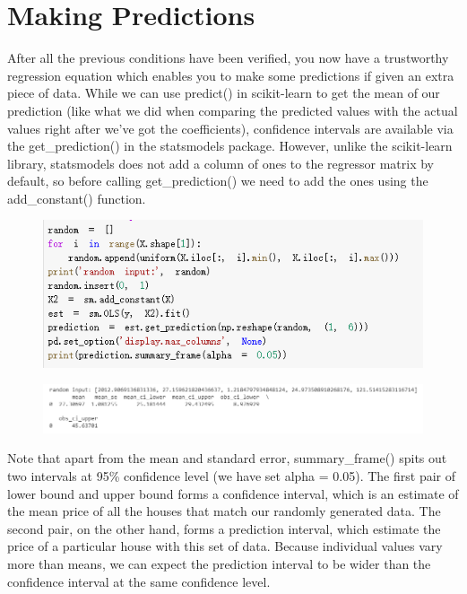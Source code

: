 \documentclass{article}
\begin{document}
\section*{Making Predictions}
After all the previous conditions have been verified, you now have a trustworthy regression equation which enables you to make some predictions if given an extra piece of data. While we can use predict() in scikit-learn to get the mean of our prediction (like what we did when comparing the predicted values with the actual values right after we've got the coefficients), confidence intervals are available via the get\_prediction() in the statsmodels package. However, unlike the scikit-learn library, statsmodels does not add a column of ones to the regressor matrix by default, so before calling get\_prediction() we need to add the ones using the add\_constant() function.
\begin{figure}[H]\centering\includegraphics[width=\linewidth]{23}\end{figure}
\begin{figure}[H]\centering\includegraphics[width=1.05\linewidth]{24}\end{figure}
Note that apart from the mean and standard error, summary\_frame() spits out two intervals at 95\% confidence level (we have set alpha = 0.05). The first pair of lower bound and upper bound forms a confidence interval, which is an estimate of the mean price of all the houses that match our randomly generated data. The second pair, on the other hand, forms a prediction interval, which estimate the price of a particular house with this set of data. Because individual values vary more than means, we can expect the prediction interval to be wider than the confidence interval at the same confidence level.
\end{document}
